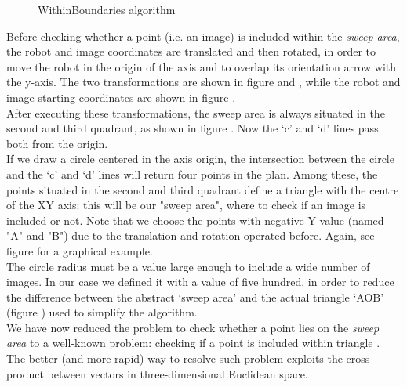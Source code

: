 \begin{figure}[htp]
\begin{center}
    \vspace*{20pt}

  \end{center}
  \caption{WithinBoundaries algorithm}
  \label{fig:withingboundaries}
\end{figure}


Before checking whether a point (i.e. an image) is included 
within the \textit{sweep area}, the robot and image coordinates
are translated and then rotated, in order to move the robot in 
the origin of the axis and to overlap its orientation arrow with 
the y-axis. The two transformations are shown in figure 
 and , 
while the robot and image starting coordinates are shown in 
figure .
\\
After executing these transformations, the sweep area is always 
situated in the second and third quadrant, as 
shown in figure . Now the `c' and `d' 
lines pass both from the origin.
\\
If we draw a circle centered in the axis origin, the intersection 
between the circle and the `c' and `d' lines will
return four points in the plan. Among these, the points situated 
in the second and third quadrant define a triangle
with the centre of the XY axis: this will be our "sweep area", 
where to check if an image is included or not. Note
that we choose the points with negative Y value (named "A" and "B") 
due to the translation and rotation operated
before. Again, see figure  
for a graphical example.
\\
The circle radius must be a value large enough to include a wide 
number of images. In our case we defined it with a
value of five hundred, in order to reduce the difference between 
the abstract `sweep area' and the actual triangle 
`AOB' (figure ) used to simplify the algorithm.
\\
We have now reduced the problem to check whether a point 
lies on the \textit{sweep area} to a well-known problem:
checking if a point is included within triangle
\cite{withinboundaries:pointintriangle}. 
The better (and more rapid) way to resolve such problem 
exploits the cross product between vectors
in three-dimensional Euclidean space.

